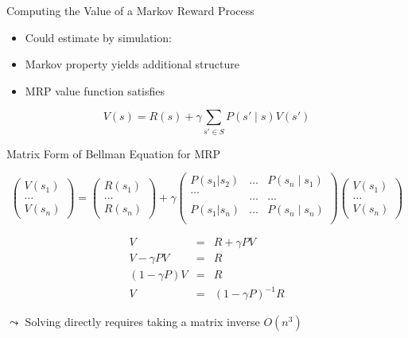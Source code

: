\begin{frame}[c]{Computing the Value of a Markov Reward Process}
	
	\begin{itemize}
		\item Could estimate by simulation:
		\item Markov property yields additional structure
		\item MRP value function satisfies
	\end{itemize}

$$V(s) = R(s) + \gamma \sum_{s' \in S} P(s'\mid s) V(s')$$
	
\end{frame}
\begin{frame}[c]{Matrix Form of Bellman Equation for MRP}

$$\begin{pmatrix}
V(s_1)\\
\ldots\\
V(s_n)
\end{pmatrix} =
\begin{pmatrix}
R(s_1)\\
\ldots\\
R(s_n)
\end{pmatrix} 
+ \gamma 
\begin{pmatrix}
P(s_1|s_2)  & \ldots &  P(s_n \mid s_1)\\
\ldots\\ 	& \ldots & \ldots \\
P(s_1| s_n) & \ldots & P(s_n \mid s_n)\\
\end{pmatrix} 
\begin{pmatrix}
V(s_1)\\
\ldots\\
V(s_n)
\end{pmatrix} 
$$

\pause

\begin{eqnarray}
V &=& R + \gamma P V\\
V  - \gamma P V &=& R\\
(1- \gamma P) V  &=& R\\
V &=& (1- \gamma P)^{-1} R
\end{eqnarray}

\pause
$\leadsto$ Solving directly requires taking a matrix inverse $O(n^3)$

\end{frame}
